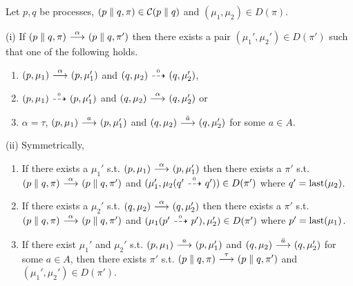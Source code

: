 \begin{lemma}\label{lemma:last_step_decomp}
    Let $p,q$ be processes, $(p\parallel q, \pi)\in\mathcal{C}(p\parallel q)$ and
    $(\mu_1,\mu_2)\in D(\pi)$.

    \noindent (i) If $(p\parallel q, \pi) \ {\stackrel{{\alpha}}{\longrightarrow}}\  (p\parallel q, \pi')$
    then there exists a pair $(\mu_1', \mu_2')\in D(\pi')$ such that one of the following
    holds.
    \begin{enumerate}
        \item $(p,\mu_1) \ {\stackrel{{\alpha}}{\longrightarrow}}\  (p,\mu_1')$ and $(q,\mu_2) \ {\stackrel{_{0}}{\dashrightarrow}}\  (q,\mu_2')$,
        \item $(p,\mu_1) \ {\stackrel{_{0}}{\dashrightarrow}}\  (p,\mu_1')$ and $(q,\mu_2) \ {\stackrel{{\alpha}}{\longrightarrow}}\  (q,\mu_2')$ or
        \item $\alpha = \tau$, $(p,\mu_1) \ {\stackrel{{a}}{\longrightarrow}}\  (p,\mu_1')$ and $(q,\mu_2) \ {\stackrel{{\bar{a}}}{\longrightarrow}}\  (q,\mu_2')$ for some $a\in A$.
    \end{enumerate}

    \noindent (ii) Symmetrically,
    \begin{enumerate}
        \item If there exists a $\mu_1'$ s.t. $(p, \mu_1) \ {\stackrel{{\alpha}}{\longrightarrow}}\  (p,\mu_1')$
            then there exists a $\pi'$ s.t. $(p\parallel q, \pi) \ {\stackrel{{\alpha}}{\longrightarrow}}\ 
            (p\parallel q, \pi')$ and $(\mu_1', \mu_2(q'\ {\stackrel{_{0}}{\dashrightarrow}}\ q')) \in D(\pi')$
            where $q' = \operatorname{last}(\mu_2)$.
        \item If there exists a $\mu_2'$ s.t. $(q, \mu_2) \ {\stackrel{{\alpha}}{\longrightarrow}}\  (q,\mu_2')$
            then there exists a $\pi'$ s.t. $(p\parallel q, \pi) \ {\stackrel{{\alpha}}{\longrightarrow}}\ 
            (p\parallel q, \pi')$ and $(\mu_1(p' \ {\stackrel{_{0}}{\dashrightarrow}}\  p'), \mu_2') \in D(\pi')$
            where $p' = \operatorname{last}(\mu_1)$.
        \item If there exist $\mu_1'$ and $\mu_2'$ s.t. $(p,\mu_1) \ {\stackrel{{a}}{\longrightarrow}}\  (p,\mu_1')$
            and $(q,\mu_2) \ {\stackrel{{\bar{a}}}{\longrightarrow}}\  (q,\mu_2')$ for some $a\in A$, then there
            exists $\pi'$ s.t. $(p\parallel q, \pi) \ {\stackrel{{\tau}}{\longrightarrow}}\  (p\parallel q, \pi')$
            and $(\mu_1', \mu_2') \in D(\pi')$.
    \end{enumerate}
\end{lemma}
